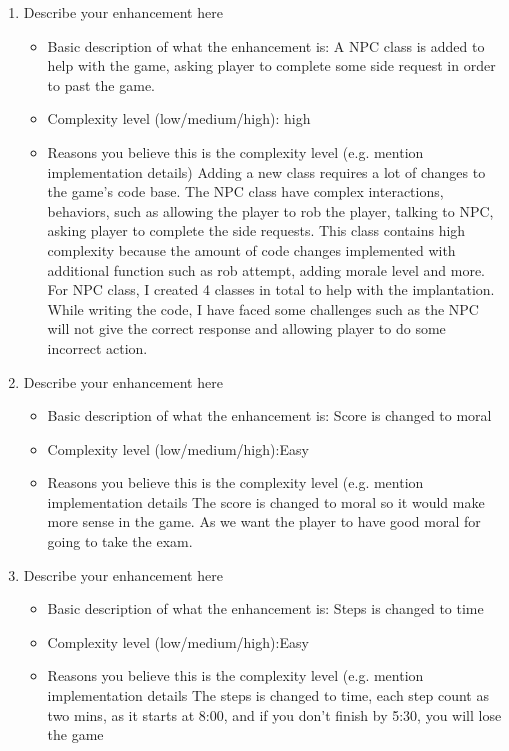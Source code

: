 \documentclass[11pt]{article}
\begin{document}
\begin{enumerate}
\item Describe your enhancement here
	\begin{itemize}
	\item Basic description of what the enhancement is:
\newline  A NPC class is added to help with the game, asking player to complete some side request in order to past the game. 
	\item Complexity level (low/medium/high): \newline high
	\item Reasons you believe this is the complexity level (e.g. mention implementation details)
 \newline Adding a new class requires a lot of  changes to the game's code base. The NPC class have complex interactions, behaviors, such as allowing the player to rob the player, talking to NPC, asking player to complete the side requests. This class contains high complexity because the amount of code changes implemented with additional function such as rob attempt, adding morale level and more. For NPC class, I created 4 classes in total to help with the implantation. While writing the code, I have faced some challenges such as the NPC will not give the correct response and allowing player to do some incorrect action.
	\end{itemize}

 \item Describe your enhancement here
	\begin{itemize}
	\item Basic description of what the enhancement is:
       \newline Score is changed to moral
	\item Complexity level (low/medium/high):\newline Easy
	\item Reasons you believe this is the complexity level (e.g. mention implementation details 
 \newline The score is changed to moral so it would make more sense in the game. As we want the player to have good moral for going to take the exam. 
	\end{itemize}

 \item Describe your enhancement here
	\begin{itemize}
	\item Basic description of what the enhancement is:
       \newline Steps is changed to time
	\item Complexity level (low/medium/high):\newline Easy
	\item Reasons you believe this is the complexity level (e.g. mention implementation details 
 \newline The steps is changed to time, each step count as two mins, as it starts at 8:00, and if you don't finish by 5:30, you will lose the game 
	\end{itemize}
 

\end{enumerate}
\end{document}
